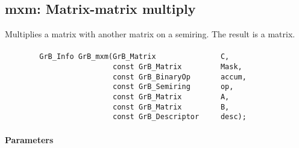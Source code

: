 \subsection{{\sf mxm}: Matrix-matrix multiply}

Multiplies a matrix with another matrix on a semiring. The result is a matrix.

\paragraph{\syntax}

\begin{verbatim}
        GrB_Info GrB_mxm(GrB_Matrix               C,
                         const GrB_Matrix         Mask,
                         const GrB_BinaryOp       accum,
                         const GrB_Semiring       op,
                         const GrB_Matrix         A, 
                         const GrB_Matrix         B,
                         const GrB_Descriptor     desc);
\end{verbatim}

\paragraph{Parameters}

